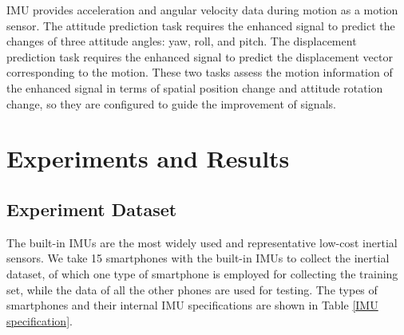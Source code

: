 \documentclass[letterpaper]{article}
\begin{document}
IMU provides acceleration and angular velocity data during motion as a motion sensor. The attitude prediction task requires the enhanced signal to predict the changes of three attitude angles: yaw, roll, and pitch. The displacement prediction task requires the enhanced signal to predict the displacement vector corresponding to the motion. These two tasks assess the motion information of the enhanced signal in terms of spatial position change and attitude rotation change, so they are configured to guide the improvement of signals.

\section{Experiments and Results}
\subsection{Experiment Dataset}
The built-in IMUs are the most widely used and representative low-cost inertial sensors. We take 15 smartphones with the built-in IMUs to collect the inertial dataset, of which one type of smartphone is employed for collecting the training set, while the data of all the other phones are used for testing. The types of smartphones and their internal IMU specifications are shown in Table \ref{IMU specification}.
\end{document}
